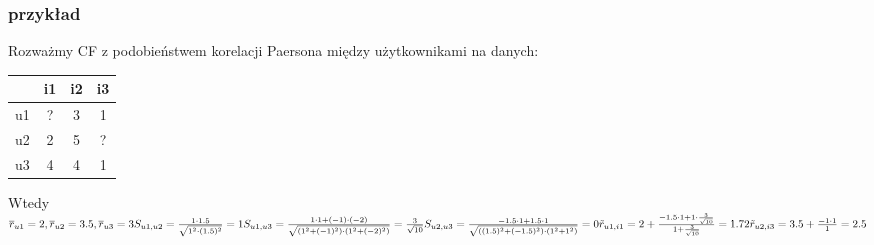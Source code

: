 \documentclass{pracamgr}
\begin{document}
    \subsubsection{przykład}
    Rozważmy CF z podobieństwem korelacji Paersona między użytkownikami na danych:\newline
    \begin{center}
     \begin{tabular}{c|ccc|}
       & i1 & i2 & i3\\
      \hline
      u1 & ? & 3 & 1\\
      u2 & 2 & 5 & ?\\
      u3 & 4 & 4 & 1\\
      \hline
     \end{tabular}
    \end{center}
    Wtedy
    $\overline{r}_{u1}=2,\overline{r}_{u2}=3.5,\overline{r}_{u3}=3\newline
    S_{u1,u2}=\frac{1\cdot 1.5}{\sqrt{1^2\cdot(1.5)^2}}=1\newline
    S_{u1,u3}=\frac{1\cdot1+(-1)\cdot(-2)}{\sqrt{(1^2+(-1)^2)\cdot(1^2+(-2)^2)}}=\frac{3}{\sqrt{10}}\newline
    S_{u2,u3}=\frac{-1.5\cdot1+1.5\cdot1}{\sqrt{((1.5)^2+(-1.5)^2)\cdot(1^2+1^2)}}=0\newline
    \tilde{r}_{u1,i1}=2+\frac{-1.5\cdot1+1\cdot\frac{3}{\sqrt{10}}}{1+\frac{3}{\sqrt{10}}}=1.72\newline
    \tilde{r}_{u2,i3}=3.5+\frac{-1\cdot1}{1}=2.5
    $
\end{document}
